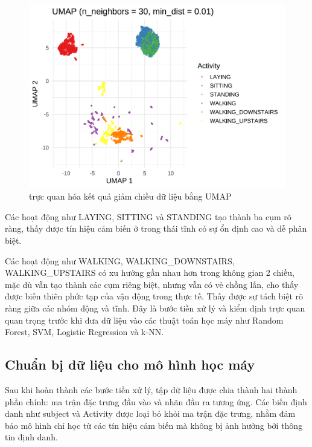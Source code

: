 \documentclass[
]{article}
\begin{document}
\begin{figure}
\centering
\includegraphics{report_files/figure-latex/unnamed-chunk-20-1.pdf}
\caption{trực quan hóa kết quả giảm chiều dữ liệu bằng UMAP}
\end{figure}

Các hoạt động như LAYING, SITTING và STANDING tạo thành ba cụm rõ ràng,
thấy được tín hiệu cảm biến ở trong thái tĩnh có sự ổn định cao và dễ
phân biệt.

Các hoạt động như WALKING, WALKING\_DOWNSTAIRS, WALKING\_UPSTAIRS có xu
hướng gần nhau hơn trong không gian 2 chiều, mặc dù vẫn tạo thành các
cụm riêng biệt, nhưng vẫn có vẻ chồng lấn, cho thấy được biến thiên phức
tạp của vận động trong thực tế. Thấy được sự tách biệt rõ ràng giữa các
nhóm động và tĩnh. Đây là bước tiền xử lý và kiểm định trực quan quan
trọng trước khi đưa dữ liệu vào các thuật toán học máy như Random
Forest, SVM, Logistic Regression và k-NN.

\subsection{Chuẩn bị dữ liệu cho mô hình học
máy}\label{chuux1ea9n-bux1ecb-dux1eef-liux1ec7u-cho-muxf4-huxecnh-hux1ecdc-muxe1y}

Sau khi hoàn thành các bước tiền xử lý, tập dữ liệu được chia thành hai
thành phần chính: ma trận đặc trưng đầu vào và nhãn đầu ra tương ứng.
Các biến định danh như subject và Activity được loại bỏ khỏi ma trận đặc
trưng, nhằm đảm bảo mô hình chỉ học từ các tín hiệu cảm biến mà không bị
ảnh hưởng bởi thông tin định danh.
\end{document}

